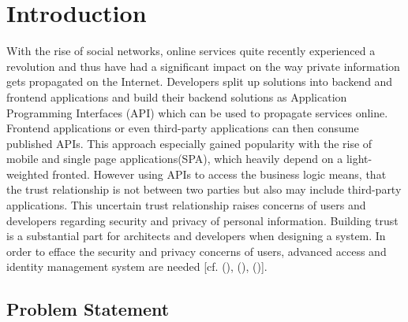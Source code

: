 \chapter{Introduction}\label{chap:introduction}
\chapterstart

With the rise of social networks, online services quite recently experienced a revolution and thus have had a significant impact on the way private information gets propagated on the Internet. Developers split up solutions into backend and frontend applications and build their backend solutions as Application Programming Interfaces (API) which can be used to propagate services online. Frontend applications or even third-party applications can then consume published APIs. This approach especially gained popularity with the rise of mobile and single page applications(SPA), which heavily depend on a light-weighted fronted. However using APIs to access the business logic means, that the trust relationship is not between two parties but also may include third-party applications. This uncertain trust relationship raises concerns of users and developers regarding security and privacy of personal information. Building trust is a substantial part for architects and developers when designing a system. In order to efface the security and privacy concerns of users, advanced access and identity management system are needed [cf. (\cite{Cirani:OBAS}), (\cite{Tkalec:2015}), (\cite{Rossvoll:2013:RUBIM})].


\section{Problem Statement}

